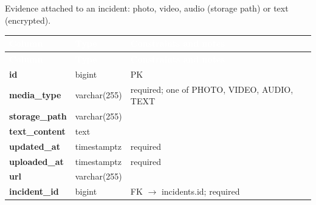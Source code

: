 \subsection*{}
Evidence attached to an incident: photo, video, audio (storage path) or text (encrypted).\par\vspace{2pt}
{\tabfont\rowband
\begin{longtable}{@{}>{\raggedright\arraybackslash}p{}>{\raggedright\arraybackslash}p{}>{\raggedright\arraybackslash}p{}@{}}
\rowcolor{najdanavy}\textcolor{white}{\sffamily\bfseries\small Column} & \textcolor{white}{\sffamily\bfseries\small Type} & \textcolor{white}{\sffamily\bfseries\small Constraints and notes}\\
\endfirsthead
\rowcolor{najdanavy}\textcolor{white}{\sffamily\bfseries\small Column} & \textcolor{white}{\sffamily\bfseries\small Type} & \textcolor{white}{\sffamily\bfseries\small Constraints and notes}\\
\endhead
\bottomrule\endlastfoot
\textbf{id} & bigint & PK\\
\textbf{media\_\allowbreak{}type} & varchar(255) & required; one of PHOTO, VIDEO, AUDIO, TEXT\\
\textbf{storage\_\allowbreak{}path} & varchar(255) & \\
\textbf{text\_\allowbreak{}content} & text & \\
\textbf{updated\_\allowbreak{}at} & timestamptz & required\\
\textbf{uploaded\_\allowbreak{}at} & timestamptz & required\\
\textbf{url} & varchar(255) & \\
\textbf{incident\_\allowbreak{}id} & bigint & FK $\rightarrow$ incidents.id; required\\
\end{longtable}}

